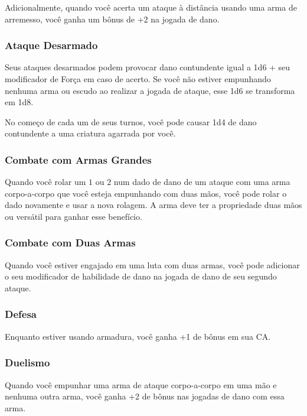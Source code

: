 \documentclass{RPG_Adventure}[2021/10/20]
\begin{document}
Adicionalmente, quando você acerta um ataque à distância usando uma arma de
arremesso, você ganha um bônus de +2 na jogada de dano.

\subsubsection{Ataque Desarmado}%
\label{ssub:ataque_desarmado}

Seus ataques desarmados podem provocar dano contundente igual a 1d6 + seu
modificador de Força em caso de acerto. Se você não estiver empunhando nenhuma
arma ou escudo ao realizar a jogada de ataque, esse 1d6 se transforma em 1d8.

No começo de cada um de seus turnos, você pode causar 1d4 de dano contundente a
uma criatura agarrada por você.

\subsubsection{Combate com Armas Grandes}%
\label{ssub:combate_com_armas_grandes}

Quando você rolar um $1$ ou $2$ num dado de dano de um ataque com uma arma
corpo-a-corpo que você esteja empunhando com duas mãos, você pode rolar o dado
novamente e usar a nova rolagem. A arma deve ter a propriedade duas mãos ou
versátil para ganhar esse benefício.

\subsubsection{Combate com Duas Armas}%
\label{ssub:combate_com_duas_armas}

Quando você estiver engajado em uma luta com duas armas, você pode adicionar o
seu modificador de habilidade de dano na jogada de dano de seu segundo ataque.

\subsubsection{Defesa}%
\label{ssub:defesa}

Enquanto estiver usando armadura, você ganha +1 de bônus em sua CA.

\subsubsection{Duelismo}%
\label{ssub:duelismo}

Quando você empunhar uma arma de ataque corpo-a-corpo em uma mão e nenhuma outra
arma, você ganha +2 de bônus nas jogadas de dano com essa arma.
\end{document}
